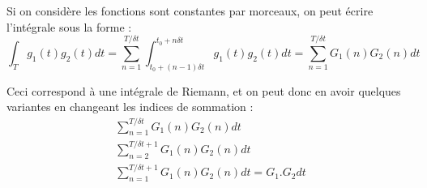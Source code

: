 Si on considère les fonctions sont constantes par morceaux, on peut écrire l'intégrale sous la forme : 
\begin{equation}
	\int_T g_1(t) g_2(t) dt 	= \sum_{n=1}^{T/\delta t} 
							\int_{t_0+(n-1)\delta t}^{t_0+n\delta t} 
								g_1(t) g_2(t) dt 
						= \sum_{n=1}^{T/\delta t} 
							G_1(n) G_2(n) dt 
\end{equation}

Ceci correspond à une intégrale de Riemann, et on peut donc en avoir quelques variantes en changeant les indices de sommation :
\begin{equation}
\begin{array}{c}
		\displaystyle
		\sum_{n=1}^{T/\delta t} 
							G_1(n) G_2(n) dt 
	\\
		\displaystyle
		\sum_{n=2}^{T/\delta t +1} 
							G_1(n) G_2(n) dt 
	\\
		\displaystyle
		\sum_{n=1}^{T/\delta t +1} 
							G_1(n) G_2(n) dt 
		= G_1.G_2 dt
\end{array}
\end{equation}